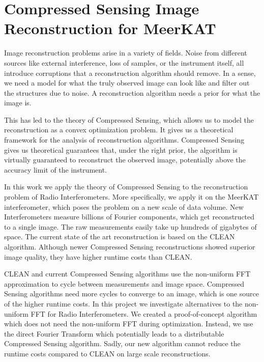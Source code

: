 \section{Compressed Sensing Image Reconstruction for MeerKAT} \label{intro}
Image reconstruction problems arise in a variety of fields. Noise from different sources like external interference, loss of samples, or the instrument itself, all introduce corruptions that a reconstruction algorithm should remove. In a sense, we need a model for what the truly observed image can look like and filter out the structures due to noise. A reconstruction algorithm needs a prior for what the image is. 

This has led to the theory of Compressed Sensing\cite{candes2006robust, donoho2006compressed}, which allows us to model the reconstruction as a convex optimization problem. It gives us a theoretical framework for the analysis of reconstruction algorithms. Compressed Sensing gives us theoretical guarantees that, under the right prior, the algorithm is virtually guaranteed to reconstruct the observed image, potentially above the accuracy limit of the instrument.

In this work we apply the theory of Compressed Sensing to the reconstruction problem of Radio Interferometers. More specifically, we apply it on the MeerKAT interferometer, which poses the problem on a new scale of data volume. New Interferometers measure billions of Fourier components, which get reconstructed to a single image. The raw measurements easily take up hundreds of gigabytes of space. The current state of the art reconstruction is based on the CLEAN\cite{rich2008multi, rau2011multi} algorithm. Although newer Compressed Sensing reconstructions showed superior image quality\cite{girard2015sparse, dabbech2018cygnus}, they have higher runtime costs than CLEAN.

CLEAN and current Compressed Sensing algorithms use the non-uniform FFT approximation to cycle between measurements and image space. Compressed Sensing algorithms need more cycles to converge to an image, which is one source of the higher runtime costs. In this project we investigate alternatives to the non-uniform FFT for Radio Interferometers. We created a proof-of-concept algorithm which does not need the non-uniform FFT during optimization. Instead, we use the direct Fourier Transform which potentially leads to a distributable Compressed Sensing algorithm. Sadly, our new algorithm cannot reduce the runtime costs compared to CLEAN on large scale reconstructions. 

